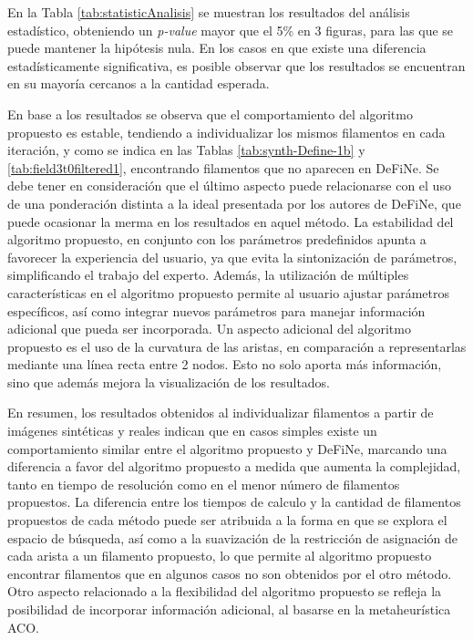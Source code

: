 En la Tabla \ref{tab:statisticAnalisis} se muestran los resultados del an\'alisis estad\'istico, obteniendo un {\it p-value} mayor que el 5\% en 3 figuras, para las que se puede mantener la hip\'otesis nula. En los casos en que existe una diferencia estad\'isticamente significativa, es posible observar que los resultados se encuentran en su mayor\'ia cercanos a la cantidad esperada.





En base a los resultados se observa que el comportamiento del algoritmo propuesto es estable, tendiendo a individualizar los mismos filamentos en cada iteraci\'on, y como se indica en las Tablas \ref{tab:synth-Define-1b} y \ref{tab:field3t0filtered1}, encontrando filamentos que no aparecen en DeFiNe. Se debe tener en consideraci\'on que el \'ultimo aspecto puede relacionarse con el uso de una ponderaci\'on distinta a la ideal presentada por los autores de DeFiNe, que puede ocasionar la merma en los resultados en aquel m\'etodo. La estabilidad del algoritmo propuesto, en conjunto con los par\'ametros predefinidos apunta a favorecer la experiencia del usuario, ya que evita la sintonizaci\'on de par\'ametros, simplificando el trabajo del experto. Adem\'as, la utilizaci\'on de m\'ultiples caracter\'isticas en el algoritmo propuesto permite al usuario ajustar par\'ametros espec\'ificos, as\'i como integrar nuevos par\'ametros para manejar informaci\'on adicional que pueda ser incorporada. Un aspecto adicional del algoritmo propuesto es el uso de la curvatura de las aristas, en comparaci\'on a representarlas mediante una l\'inea recta entre 2 nodos. Esto no solo aporta m\'as informaci\'on, sino que adem\'as mejora la visualizaci\'on de los resultados. 

\hspace{1cm}

En resumen, los resultados obtenidos al individualizar filamentos a partir de im\'agenes sint\'eticas y reales indican que en casos simples existe un comportamiento similar entre el algoritmo propuesto y DeFiNe, marcando una diferencia a favor del algoritmo propuesto a medida que aumenta la complejidad, tanto en tiempo de resoluci\'on como en el menor n\'umero de filamentos propuestos. La diferencia entre los tiempos de calculo y la cantidad de filamentos propuestos de cada m\'etodo puede ser atribuida a la forma en que se explora el espacio de b\'usqueda, as\'i como a la suavizaci\'on de la restricci\'on de asignaci\'on de cada arista a un filamento propuesto, lo que permite al algoritmo propuesto encontrar filamentos que en algunos casos no son obtenidos por el otro m\'etodo. Otro aspecto relacionado a la flexibilidad del algoritmo propuesto se refleja la posibilidad de incorporar informaci\'on adicional, al basarse en la metaheur\'istica ACO.

